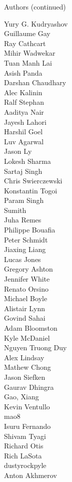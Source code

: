 \begin{frame}{Authors (continued)}
\begin{multicols}{5}
Yury G. Kudryashov\\
Guillaume Gay\\
Ray Cathcart\\
Mihir Wadwekar\\
Tuan Manh Lai\\
Asish Panda\\
Darshan Chaudhary\\
Alec Kalinin\\
Ralf Stephan\\
Aaditya Nair\\
Jayesh Lahori\\
Harshil Goel\\
Luv Agarwal\\
Jason Ly\\
Lokesh Sharma\\
Sartaj Singh\\
Chris Swierczewski\\
Konstantin Togoi\\
Param Singh\\
Sumith\\
Juha Remes\\
Philippe Bouafia\\
Peter Schmidt\\
Jiaxing Liang\\
Lucas Jones\\
Gregory Ashton\\
Jennifer White\\
Renato Orsino\\
Michael Boyle\\
Alistair Lynn\\
Govind Sahai\\
Adam Bloomston\\
Kyle McDaniel\\
Nguyen Truong Duy\\
Alex Lindsay\\
Mathew Chong\\
Jason Siefken\\
Gaurav Dhingra\\
Gao, Xiang\\
Kevin Ventullo\\
mao8\\
Isuru Fernando\\
Shivam Tyagi\\
Richard Otis\\
Rich LaSota\\
dustyrockpyle\\
Anton Akhmerov\\

\end{multicols}
\end{frame}
